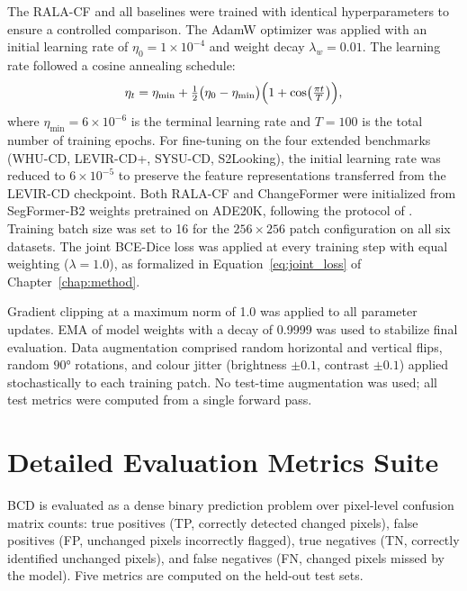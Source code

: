 The \ac{RALA-CF} and all baselines were trained with identical hyperparameters to ensure a controlled comparison. The AdamW optimizer was applied with an initial learning rate of $\eta_0 = 1 \times 10^{-4}$ and weight decay $\lambda_w = 0.01$. The learning rate followed a cosine annealing schedule:
\begin{equation}
\eta_t = \eta_{\min} + \tfrac{1}{2}\bigl(\eta_0 - \eta_{\min}\bigr)
         \Bigl(1 + \cos\bigl(\tfrac{\pi t}{T}\bigr)\Bigr),
\label{eq:cosine_lr}
\end{equation}
where $\eta_{\min} = 6 \times 10^{-6}$ is the terminal learning rate and $T = 100$ is the total number of training epochs. For fine-tuning on the four extended benchmarks (WHU-CD, LEVIR-CD+, SYSU-CD, S2Looking), the initial learning rate was reduced to $6 \times 10^{-5}$ to preserve the feature representations transferred from the LEVIR-CD checkpoint. Both \ac{RALA-CF} and ChangeFormer were initialized from SegFormer-B2 weights pretrained on ADE20K, following the protocol of \cite{Bandara2022ChangeFormer}. Training batch size was set to 16 for the $256 \times 256$ patch configuration on all six datasets. The joint \ac{BCE}-Dice loss was applied at every training step with equal weighting ($\lambda = 1.0$), as formalized in Equation~\ref{eq:joint_loss} of Chapter~\ref{chap:method}.

Gradient clipping at a maximum norm of 1.0 was applied to all parameter updates. \ac{EMA} of model weights with a decay of 0.9999 was used to stabilize final evaluation. Data augmentation comprised random horizontal and vertical flips, random $90°$ rotations, and colour jitter (brightness $\pm 0.1$, contrast $\pm 0.1$) applied stochastically to each training patch. No test-time augmentation was used; all test metrics were computed from a single forward pass.


\section{Detailed Evaluation Metrics Suite}
\label{sec:exp-metrics}

\ac{BCD} is evaluated as a dense binary prediction problem over pixel-level confusion matrix counts: true positives (\ac{TP}, correctly detected changed pixels), false positives (\ac{FP}, unchanged pixels incorrectly flagged), true negatives (\ac{TN}, correctly identified unchanged pixels), and false negatives (\ac{FN}, changed pixels missed by the model). Five metrics are computed on the held-out test sets.

